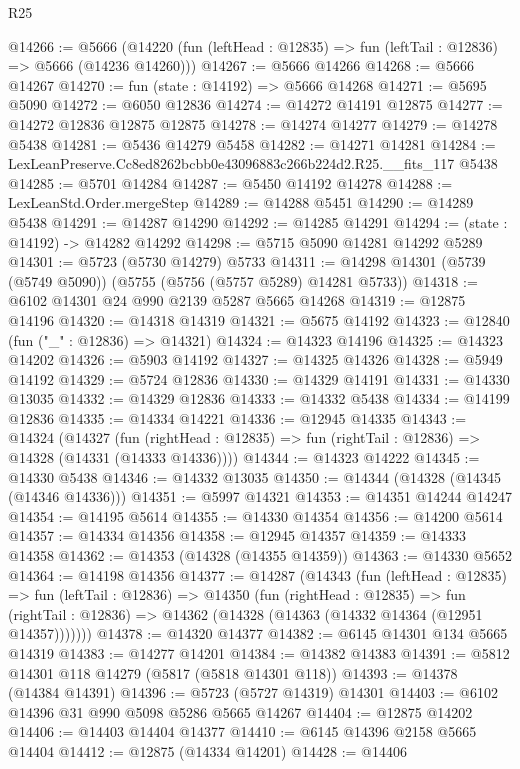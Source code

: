 \begin{lexlean}{R25}
\begin{coremodule}
@14266 := @5666
    (@14220 (fun (leftHead : @12835) => fun (leftTail : @12836) => @5666 (@14236 @14260)))
@14267 := @5666 @14266
@14268 := @5666 @14267
@14270 := fun (state : @14192) => @5666 @14268
@14271 := @5695 @5090
@14272 := @6050 @12836
@14274 := @14272 @14191 @12875
@14277 := @14272 @12836 @12875 @12875
@14278 := @14274 @14277
@14279 := @14278 @5438
@14281 := @5436 @14279 @5458
@14282 := @14271 @14281
@14284 := LexLeanPreserve.Cc8ed8262bcbb0e43096883c266b224d2.R25.__fits_117 @5438
@14285 := @5701 @14284
@14287 := @5450 @14192 @14278
@14288 := LexLeanStd.Order.mergeStep
@14289 := @14288 @5451
@14290 := @14289 @5438
@14291 := @14287 @14290
@14292 := @14285 @14291
@14294 := (state : @14192) -> @14282 @14292
@14298 := @5715 @5090 @14281 @14292 @5289
@14301 := @5723 (@5730 @14279) @5733
@14311 := @14298 @14301 (@5739 (@5749 @5090)) (@5755 (@5756 (@5757 @5289) @14281 @5733))
@14318 := @6102 @14301 @24 @990 @2139 @5287 @5665 @14268
@14319 := @12875 @14196
@14320 := @14318 @14319
@14321 := @5675 @14192
@14323 := @12840 (fun ("_" : @12836) => @14321)
@14324 := @14323 @14196
@14325 := @14323 @14202
@14326 := @5903 @14192
@14327 := @14325 @14326
@14328 := @5949 @14192
@14329 := @5724 @12836
@14330 := @14329 @14191
@14331 := @14330 @13035
@14332 := @14329 @12836
@14333 := @14332 @5438
@14334 := @14199 @12836
@14335 := @14334 @14221
@14336 := @12945 @14335
@14343 := @14324
    (@14327
      (fun (rightHead : @12835) => fun (rightTail : @12836) => @14328 (@14331 (@14333 @14336))))
@14344 := @14323 @14222
@14345 := @14330 @5438
@14346 := @14332 @13035
@14350 := @14344 (@14328 (@14345 (@14346 @14336)))
@14351 := @5997 @14321
@14353 := @14351 @14244 @14247
@14354 := @14195 @5614
@14355 := @14330 @14354
@14356 := @14200 @5614
@14357 := @14334 @14356
@14358 := @12945 @14357
@14359 := @14333 @14358
@14362 := @14353 (@14328 (@14355 @14359))
@14363 := @14330 @5652
@14364 := @14198 @14356
@14377 := @14287
    (@14343
      (fun (leftHead : @12835) =>
      fun (leftTail : @12836) =>
      @14350
        (fun (rightHead : @12835) =>
        fun (rightTail : @12836) => @14362 (@14328 (@14363 (@14332 @14364 (@12951 @14357)))))))
@14378 := @14320 @14377
@14382 := @6145 @14301 @134 @5665 @14319
@14383 := @14277 @14201
@14384 := @14382 @14383
@14391 := @5812 @14301 @118 @14279 (@5817 (@5818 @14301 @118))
@14393 := @14378 (@14384 @14391)
@14396 := @5723 (@5727 @14319) @14301
@14403 := @6102 @14396 @31 @990 @5098 @5286 @5665 @14267
@14404 := @12875 @14202
@14406 := @14403 @14404 @14377
@14410 := @6145 @14396 @2158 @5665 @14404
@14412 := @12875 (@14334 @14201)
@14428 := @14406

\end{coremodule}
\end{lexlean}
